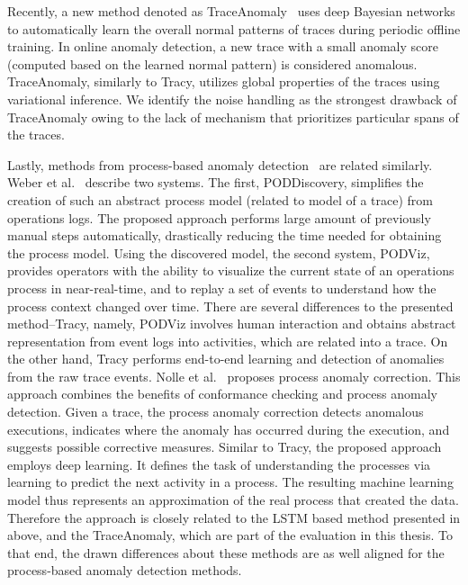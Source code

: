Recently, a new method denoted as TraceAnomaly~\cite{liu2020unsupervised} uses deep Bayesian networks to automatically learn the overall normal patterns of traces during periodic offline training. In online anomaly detection, a new trace with a small anomaly score (computed based on the learned normal pattern) is considered anomalous. TraceAnomaly, similarly to Tracy, utilizes global properties of the traces using variational inference. We identify the noise handling as the strongest drawback of TraceAnomaly owing to the lack of mechanism that prioritizes particular spans of the traces.

Lastly, methods from process-based anomaly detection~\cite{nolle2020process,PECCHIA2020105054,nolle2016unsupervised,nolle2018analyzing,nolle2019binet,imweber2015,xu2014weber,rehse2020} are related similarly. Weber et al.~\cite{imweber2015} describe two systems. The first, PODDiscovery, simplifies the creation of such an abstract process model (related to model of a trace) from operations logs. The proposed approach performs large amount of previously manual steps automatically, drastically reducing the time needed for obtaining the process model. Using the discovered model, the second system, PODViz, provides operators with the ability to visualize the current state of an operations process in near-real-time, and to replay a set of events to understand how the process context changed over time. There are several differences to the presented method--Tracy, namely, PODViz involves human interaction and obtains abstract representation from event logs into activities, which are related into a trace. On the other hand, Tracy performs end-to-end learning and detection of anomalies from the raw trace events. Nolle et al.~\cite{nolle2020process,nolle2016unsupervised,nolle2018analyzing,nolle2019binet} proposes process anomaly correction. This approach combines the benefits of conformance checking and process anomaly detection. Given a trace, the process anomaly correction detects anomalous executions, indicates where the anomaly has occurred during the execution, and suggests possible corrective measures. Similar to Tracy, the proposed approach employs deep learning. It defines the task of understanding the processes via learning to predict the next activity in a process. The resulting machine learning model thus represents an approximation of the real process that created the data. Therefore the approach is closely related to the LSTM based method presented in above, and the TraceAnomaly, which are part of the evaluation in this thesis. To that end, the drawn differences about these methods are as well aligned for the process-based anomaly detection methods.

